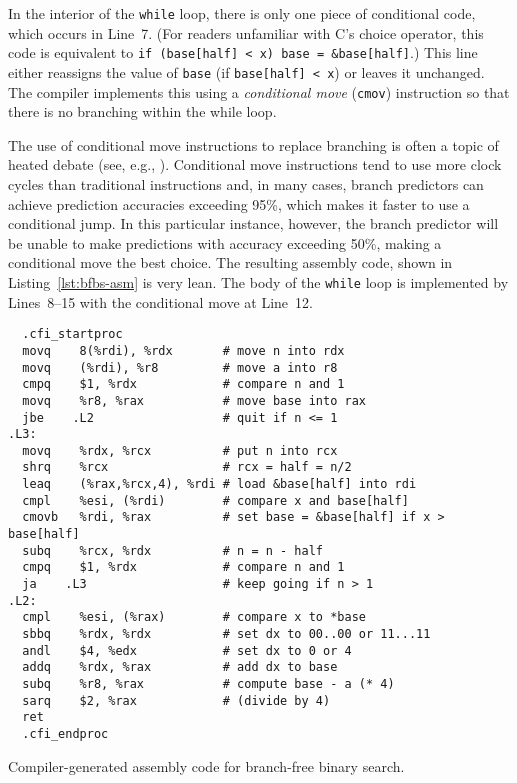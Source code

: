 \documentclass{patmorin}
\newcommand{\lstlabel}[1]{\label{lst:#1}}
\newcommand{\lstref}[1]{Listing~\ref{lst:#1}}
\begin{document}
In the interior of the \texttt{while} loop, there is only
one piece of conditional code, which occurs in Line~7.  (For readers
unfamiliar with C's choice operator, this code is equivalent
to \texttt{if (base[half] < x) base = &base[half]}.)
This line either reassigns the value of \texttt{base} (if
\texttt{base[half] < x}) or leaves it unchanged.  The compiler
implements this using a \emph{conditional move} (\texttt{cmov})
instruction so that there is no branching within the while loop.

The use of conditional move instructions to replace branching is
often a topic of heated debate (see, e.g., \cite{X}).  Conditional move
instructions tend to use more clock cycles than traditional instructions
and, in many cases, branch predictors can achieve prediction accuracies
exceeding 95\%, which makes it faster to use a conditional jump.  In this
particular instance, however, the branch predictor will be unable to make
predictions with accuracy exceeding 50\%, making a conditional move the
best choice.  The resulting assembly code, shown in \lstref{bfbs-asm} is
very lean.  The body of the \texttt{while} loop is implemented
by Lines~8--15 with the conditional move at Line~12.


\begin{listing}
\begin{verbatim}
  .cfi_startproc
  movq    8(%rdi), %rdx       # move n into rdx
  movq    (%rdi), %r8         # move a into r8
  cmpq    $1, %rdx            # compare n and 1
  movq    %r8, %rax           # move base into rax
  jbe    .L2                  # quit if n <= 1
.L3:
  movq    %rdx, %rcx          # put n into rcx
  shrq    %rcx                # rcx = half = n/2
  leaq    (%rax,%rcx,4), %rdi # load &base[half] into rdi
  cmpl    %esi, (%rdi)        # compare x and base[half]
  cmovb   %rdi, %rax          # set base = &base[half] if x > base[half]
  subq    %rcx, %rdx          # n = n - half
  cmpq    $1, %rdx            # compare n and 1
  ja    .L3                   # keep going if n > 1
.L2:
  cmpl    %esi, (%rax)        # compare x to *base
  sbbq    %rdx, %rdx          # set dx to 00..00 or 11...11
  andl    $4, %edx            # set dx to 0 or 4 
  addq    %rdx, %rax          # add dx to base
  subq    %r8, %rax           # compute base - a (* 4)
  sarq    $2, %rax            # (divide by 4)
  ret
  .cfi_endproc
\end{verbatim}
\caption{Compiler-generated assembly code for branch-free binary search.}
\lstlabel{bfbs-asm}
\end{listing}
\end{document}
